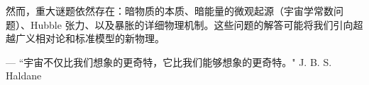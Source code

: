 然而，重大谜题依然存在：暗物质的本质、暗能量的微观起源（宇宙学常数问题）、Hubble 张力、以及暴胀的详细物理机制。这些问题的解答可能将我们引向超越广义相对论和标准模型的新物理。

\begin{flushright}
    --- ``宇宙不仅比我们想象的更奇特，它比我们能够想象的更奇特。" \hspace{2em} J. B. S. Haldane
\end{flushright}

